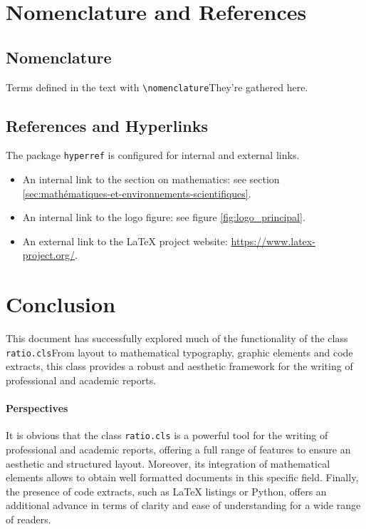 \documentclass{mytex}
\begin{document}
\section{Nomenclature and References}

\subsection{Nomenclature}
Terms defined in the text with \verb|\nomenclature|They're gathered here.
\printnomenclature

\subsection{References and Hyperlinks}
The package \texttt{hyperref} is configured for internal and external links.
\begin{itemize}
	\item An internal link to the section on mathematics: see section \ref{sec:mathématiques-et-environnements-scientifiques}.
	\item An internal link to the logo figure: see figure \ref{fig:logo_principal}.
	\item An external link to the LaTeX project website: \url{https://www.latex-project.org/}.
\end{itemize}


\section{Conclusion}

This document has successfully explored much of the functionality of the class \texttt{ratio.cls}From layout to mathematical typography, graphic elements and code extracts, this class provides a robust and aesthetic framework for the writing of professional and academic reports.

\paragraph*{Perspectives}
It is obvious that the class \texttt{ratio.cls} is a powerful tool for the writing of professional and academic reports, offering a full range of features to ensure an aesthetic and structured layout. Moreover, its integration of mathematical elements allows to obtain well formatted documents in this specific field. Finally, the presence of code extracts, such as LaTeX listings or Python, offers an additional advance in terms of clarity and ease of understanding for a wide range of readers.

\merci
\end{document}
